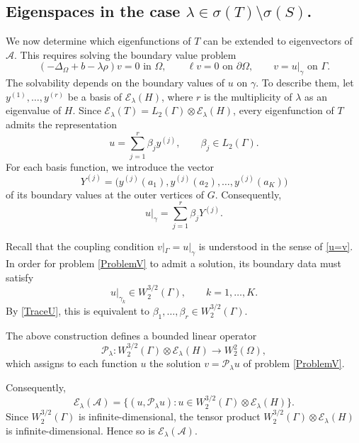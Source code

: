 \documentclass[reqno]{amsart}
\theoremstyle{definition}
\theoremstyle{remark}
\numberwithin{equation}{section}
\newcommand{\cA}{\mathcal{A}}
\newcommand{\cE}{\mathcal{E}}
\newcommand{\cP}{\mathcal{P}}
\begin{document}
\subsection{Eigenspaces in the case $\lambda\in\sigma(T)\setminus\sigma(S)$.}
We now determine which eigenfunctions of $T$ can be extended to eigenvectors of~$\cA$. This requires solving the boundary value problem
\begin{equation}\label{ProblemV}
(-\Delta_{\Omega}+b-\lambda\rho)v=0 \text{ in }\Omega,\qquad \ell v=0 \text{ on }\partial\Omega,\qquad v=u|_\gamma\text{ on }\Gamma.
\end{equation}
The solvability depends on the boundary values of $u$ on $\gamma$. To describe them, let $y^{(1)},\dots,y^{(r)}$ be a basis of $\cE_\lambda(H)$, where $r$ is the multiplicity of $\lambda$ as an eigenvalue of $H$. Since $\cE_\lambda(T)=L_2(\Gamma)\otimes\cE_\lambda(H)$, every eigenfunction of $T$ admits the representation
\begin{equation}\label{UrepreL2}
u=\sum_{j=1}^r\beta_jy^{(j)},\qquad
\beta_j\in L_2(\Gamma).
\end{equation}
For each basis function, we introduce the vector
\begin{equation*}
Y^{(j)}=
\bigl(y^{(j)}(a_1),y^{(j)}(a_2),\dots,y^{(j)}(a_K)\bigr)
\end{equation*}
of its boundary values at the outer vertices of $G$. Consequently,
\begin{equation}\label{TraceU}
u|_\gamma=\sum_{j=1}^r\beta_jY^{(j)}.
\end{equation}

Recall that the coupling condition $v|_\Gamma=u|_\gamma$ is understood in the sense of \eqref{u=v}. In order for problem \eqref{ProblemV} to admit a
solution, its boundary data must satisfy
\begin{equation*}
u|_{\gamma_k}\in W_2^{3/2}(\Gamma),\qquad k=1,\dots,K.
\end{equation*}
By \eqref{TraceU}, this is equivalent to $\beta_1,\dots,\beta_r\in W_2^{3/2}(\Gamma)$.



The above construction defines a bounded linear operator
\begin{equation}\label{OperatorP}
    \cP_\lambda\colon W_2^{3/2}(\Gamma)\otimes\cE_\lambda(H)\to W_2^2(\Omega),
\end{equation}
which assigns to each function $u$ the solution $v=\cP_\lambda u$ of problem \eqref{ProblemV}.

Consequently,
\begin{equation*}
\cE_\lambda(\cA)=\big\{(u,\cP_\lambda u)\colon u\in W_2^{3/2}(\Gamma)\otimes\cE_\lambda(H)\big\}.
\end{equation*}
Since $W_2^{3/2}(\Gamma)$ is infinite-dimensional, the tensor product $W_2^{3/2}(\Gamma)\otimes\cE_\lambda(H)$ is infinite-dimensional. Hence so is $\cE_\lambda(\cA)$.
\end{document}
